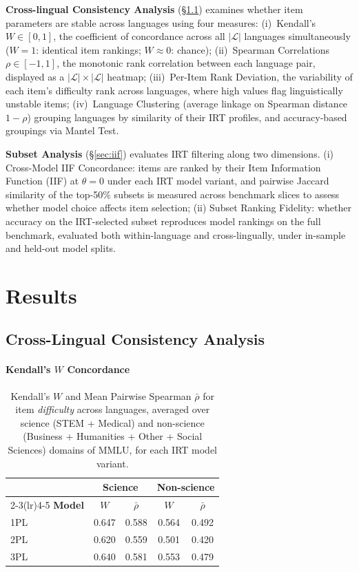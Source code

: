 \documentclass[11pt]{article}
\begin{document}
\textbf{Cross-lingual Consistency Analysis} (§\ref{sec:cross_lingual}) examines whether item parameters are stable across languages using four measures:
(i)~Kendall's $W \in [0,1]$, the coefficient of concordance across all $|\mathcal{L}|$ languages simultaneously ($W=1$: identical item rankings; $W\approx 0$: chance);
(ii)~Spearman Correlations $\rho \in [-1,1]$, the monotonic rank correlation between each language pair, displayed as a $|\mathcal{L}|\times|\mathcal{L}|$ heatmap;
(iii)~Per-Item Rank Deviation, the variability of each item's difficulty rank across languages, where high values flag linguistically unstable items;
(iv)~Language Clustering (average linkage on Spearman distance $1-\rho$) grouping languages by similarity of their IRT profiles, and accuracy-based groupings via Mantel Test.

\textbf{Subset Analysis} (§\ref{sec:iif}) evaluates IRT filtering along two dimensions. (i)~ Cross-Model IIF Concordance: items are ranked by their Item Information Function (IIF) at $\theta=0$ under each IRT model variant, and pairwise Jaccard similarity of the top-50\% subsets is measured across benchmark slices to assess whether model choice affects item selection; (ii) Subset Ranking Fidelity: whether accuracy on the IRT-selected subset reproduces model rankings on the full benchmark, evaluated both within-language and cross-lingually, under in-sample and held-out model splits.

\section{Results}
\label{sec:results}

\subsection{Cross-Lingual Consistency Analysis}
\label{sec:cross_lingual}

\paragraph{Kendall's $W$ Concordance}

\begin{table}[t]
  \centering
  \small
  \begin{tabular}{lcccc}
    \toprule
    & \multicolumn{2}{c}{\textbf{Science}} & \multicolumn{2}{c}{\textbf{Non-science}} \\
    \cmidrule(lr){2-3}\cmidrule(lr){4-5}
    \textbf{Model} & $W$ & $\bar{\rho}$ & $W$ & $\bar{\rho}$ \\
    \midrule
    1PL & 0.647 & 0.588 & 0.564 & 0.492 \\
    2PL & 0.620 & 0.559 & 0.501 & 0.420 \\
    3PL & 0.640 & 0.581 & 0.553 & 0.479 \\
    \bottomrule
  \end{tabular}
  \caption{ Kendall's $W$ and Mean Pairwise Spearman $\bar{\rho}$ for item
    \emph{difficulty} across languages, averaged over science (STEM + Medical)
    and non-science (Business + Humanities + Other + Social Sciences) domains
    of MMLU, for each IRT model variant.}
  \label{tab:science_vs_nonsci}
\end{table}
\end{document}
